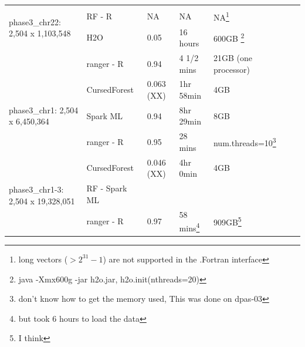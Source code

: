 \documentclass[10pt,letterpaper]{article}
\newcommand{\cursedforest}{{\sc CursedForest}}
\begin{document}
\begin{table}[!ht]
\begin{minipage}{\textwidth}
\begin{adjustwidth}{-2.25in}{0in}
\begin{tabular}{|l|l|l|l|l|l|p{1cm}|}
 \hline
\multirow{3}{*}{phase3\_chr22: 2,504 x 1,103,548}   &               &            &                  &                                                                \\
                                                    & RF - R        & NA         & NA               & NA\footnote{long vectors ($> 2^31-1$)  are not supported in the .Fortran interface} \\
                                                    & H2O           & 0.05       & 16 hours         & 600GB \footnote{java -Xmx600g -jar h2o.jar,   h2o.init(nthreads=20)} \\
                                                    & ranger - R    & 0.94       & 4 1/2 mins       & 21GB (one processor) \\
\hline
\multirow{3}{*}{phase3\_chr1: 2,504 x 6,450,364}    & \cursedforest\ & 0.063 (XX) & 1hr 58min        & 4GB \\
                                                    & Spark ML  & 0.94       & 8hr 29min        & 8GB \\
                                                    & ranger - R      & 0.95       & 28 mins          & num.threads=10\footnote{don't
                                                                                                      know how to get the memory
                                                                                                      used,   This was done on dpas-03} \\
\hline
\multirow{3}{*}{phase3\_chr1-3: 2,504 x 19,328,051} & \cursedforest\ & 0.046 (XX) & 4hr 0min                                             & 4GB \\
                                                    & RF - Spark ML  &            &                                                      & \\
                                                    & ranger - R      &  0.97      & 58 mins\footnote{ but took 6 hours to load the
                                                                                   data}
                                                                                                                                         &
                                                                                                                                           909GB\footnote{I
                                                                                                                                           think
}
\end{tabular}
\end{adjustwidth}
\end{minipage}
\end{table}
\end{document}
